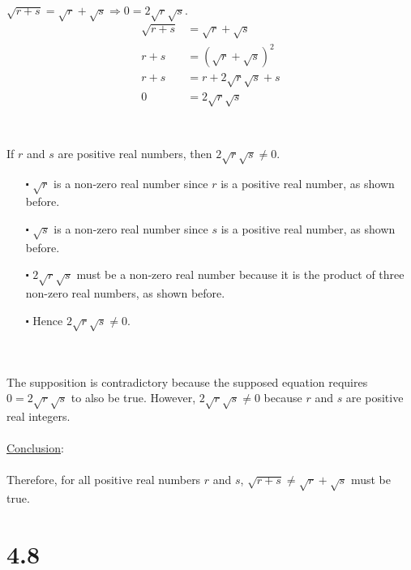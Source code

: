 \documentclass[12pt]{article}
\begin{document}
\newblock
\\ \\
$\sqrt{r+s} = \sqrt{r} + \sqrt{s} \Rightarrow 0 = 2\sqrt{r}\sqrt{s}$.
\begin{align*}
  \sqrt{r+s} &= \sqrt{r} + \sqrt{s} \\
  r+s &= (\sqrt{r} + \sqrt{s})^2 \\
  r+s&= r + 2\sqrt{r}\sqrt{s} + s\\
  0 &= 2\sqrt{r}\sqrt{s}\\
\end{align*}
\newblock
\\ \\
If $r$ and $s$ are positive real numbers, then $2\sqrt{r}\sqrt{s} \neq 0$.
\begin{itemize}
  \item [$\centerdot$] $\sqrt{r}$ is a non-zero real number since $r$ is a positive real number, as shown before.
  \item [$\centerdot$] $\sqrt{s}$ is a non-zero real number since $s$ is a positive real number, as shown before.
  \item [$\centerdot$] $2\sqrt{r}\sqrt{s}$ must be a non-zero real number because 
  it is the product of three non-zero real numbers, as shown before.
  \item [$\centerdot$] Hence $2\sqrt{r}\sqrt{s} \neq 0$.
\end{itemize}
\newblock
\\ \\
The supposition is contradictory because the supposed equation requires $0 = 2\sqrt{r}\sqrt{s}$ to also be true. 
However, $2\sqrt{r}\sqrt{s} \neq 0$ because $r$ and $s$ are positive real integers.
\newblock
\\ \\
\underline{Conclusion}:
\\ \\
Therefore, for all positive real numbers $r$ and $s$, $\sqrt{r+s} \neq \sqrt{r} + \sqrt{s}$ must be true.
\section*{4.8}
\end{document}
